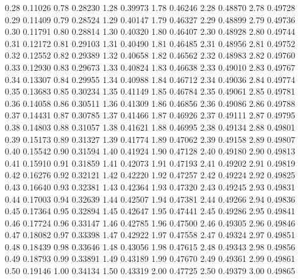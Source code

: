\documentclass[onecolumn,12pt]{book}
\begin{document}
\begin{Schunk}
\begin{Soutput}
 0.28 0.11026 0.78 0.28230 1.28 0.39973 1.78 0.46246 2.28 0.48870 2.78 0.49728
 0.29 0.11409 0.79 0.28524 1.29 0.40147 1.79 0.46327 2.29 0.48899 2.79 0.49736
 0.30 0.11791 0.80 0.28814 1.30 0.40320 1.80 0.46407 2.30 0.48928 2.80 0.49744
 0.31 0.12172 0.81 0.29103 1.31 0.40490 1.81 0.46485 2.31 0.48956 2.81 0.49752
 0.32 0.12552 0.82 0.29389 1.32 0.40658 1.82 0.46562 2.32 0.48983 2.82 0.49760
 0.33 0.12930 0.83 0.29673 1.33 0.40824 1.83 0.46638 2.33 0.49010 2.83 0.49767
 0.34 0.13307 0.84 0.29955 1.34 0.40988 1.84 0.46712 2.34 0.49036 2.84 0.49774
 0.35 0.13683 0.85 0.30234 1.35 0.41149 1.85 0.46784 2.35 0.49061 2.85 0.49781
 0.36 0.14058 0.86 0.30511 1.36 0.41309 1.86 0.46856 2.36 0.49086 2.86 0.49788
 0.37 0.14431 0.87 0.30785 1.37 0.41466 1.87 0.46926 2.37 0.49111 2.87 0.49795
 0.38 0.14803 0.88 0.31057 1.38 0.41621 1.88 0.46995 2.38 0.49134 2.88 0.49801
 0.39 0.15173 0.89 0.31327 1.39 0.41774 1.89 0.47062 2.39 0.49158 2.89 0.49807
 0.40 0.15542 0.90 0.31594 1.40 0.41924 1.90 0.47128 2.40 0.49180 2.90 0.49813
 0.41 0.15910 0.91 0.31859 1.41 0.42073 1.91 0.47193 2.41 0.49202 2.91 0.49819
 0.42 0.16276 0.92 0.32121 1.42 0.42220 1.92 0.47257 2.42 0.49224 2.92 0.49825
 0.43 0.16640 0.93 0.32381 1.43 0.42364 1.93 0.47320 2.43 0.49245 2.93 0.49831
 0.44 0.17003 0.94 0.32639 1.44 0.42507 1.94 0.47381 2.44 0.49266 2.94 0.49836
 0.45 0.17364 0.95 0.32894 1.45 0.42647 1.95 0.47441 2.45 0.49286 2.95 0.49841
 0.46 0.17724 0.96 0.33147 1.46 0.42785 1.96 0.47500 2.46 0.49305 2.96 0.49846
 0.47 0.18082 0.97 0.33398 1.47 0.42922 1.97 0.47558 2.47 0.49324 2.97 0.49851
 0.48 0.18439 0.98 0.33646 1.48 0.43056 1.98 0.47615 2.48 0.49343 2.98 0.49856
 0.49 0.18793 0.99 0.33891 1.49 0.43189 1.99 0.47670 2.49 0.49361 2.99 0.49861
 0.50 0.19146 1.00 0.34134 1.50 0.43319 2.00 0.47725 2.50 0.49379 3.00 0.49865
\end{Soutput}
\end{Schunk}
\vfill\eject
\end{document}
